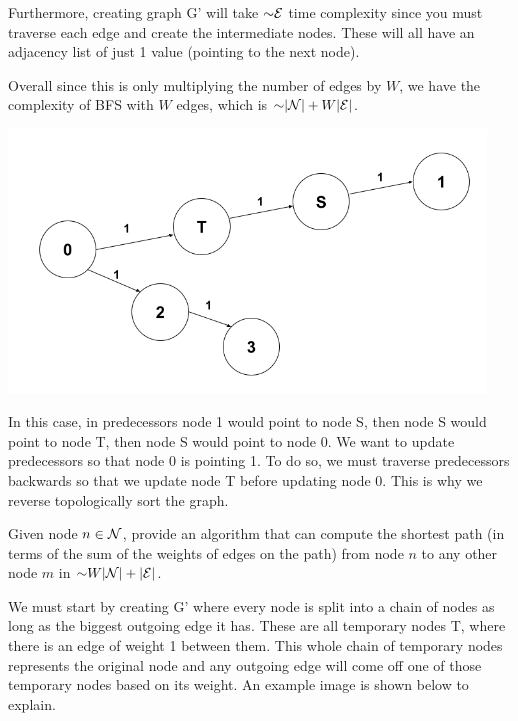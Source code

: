 \begin{problem}
\begin{questions}
Furthermore, creating graph G' will take $\mathord{\sim}\mathcal{E}$ time complexity since you must traverse each edge and create the intermediate nodes. These will all have an adjacency list of just 1 value (pointing to the next node).

Overall since this is only multiplying the number of edges by $W$, we have the complexity of BFS with $W$ edges, which is $\mathord{\sim}\lvert \mathcal{N} \rvert + W\lvert \mathcal{E} \rvert$.

\includegraphics[height=7cm]{assn 4.png}

In this case, in predecessors node 1 would point to node S, then node S would point to node T, then node S would point to node 0. We want to update predecessors so that node 0 is pointing 1. To do so, we must traverse predecessors backwards so that we update node T before updating node 0. This is why we reverse topologically sort the graph.

\item Given node $n \in \mathcal{N}$, provide an algorithm that can compute the shortest path (in terms of the sum of the weights of edges on the path) from node $n$ to any other node $m$ in $\mathord{\sim}W\lvert \mathcal{N} \rvert + \lvert \mathcal{E} \rvert$.

We must start by creating G' where every node is split into a chain of nodes as long as the biggest outgoing edge it has. These are all temporary nodes T, where there is an edge of weight 1 between them. This whole chain of temporary nodes represents the original node and any outgoing edge will come off one of those temporary nodes based on its weight. An example image is shown below to explain.


\end{questions}
\end{problem}
